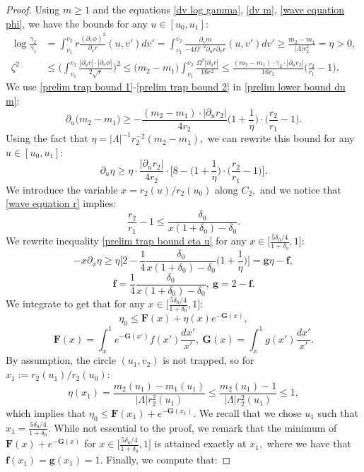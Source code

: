 \documentclass[11pt]{article}
\numberwithin{equation}{section}
\begin{document}
\begin{proof}
    
    Using $m\geq1$ and the equations \eqref{dv log gamma}, \eqref{dv m}, \eqref{wave equation phi}, we have the bounds for any $u\in[u_0,u_1]$:
    \begin{align}
        \log\frac{\gamma_2}{\gamma_1}&=\int_{v_1}^{v_2}r\frac{(\partial_v\phi)^2}{\partial_vr}(u,v')dv'=\int_{v_1}^{v_2}\frac{\partial_vm}{-4\Omega^{-2}\partial_ur\partial_vr}(u,v')dv'\geq\frac{m_2-m_1}{|\Lambda|r_2^2}=\eta>0,\label{prelim trap bound 1}\\
        \zeta^2&\leq\bigg(\int_{v_1}^{v_2}\frac{|\partial_ur|\cdot|\partial_v\phi|}{2\sqrt{r}}\bigg)^2\leq\big(m_2-m_1\big)\int_{v_1}^{v_2}\frac{\Omega^{2}|\partial_ur|}{16r^2}\leq\frac{(m_2-m_1)\cdot \gamma_2\cdot|\partial_ur_2|}{16r_2}\bigg(\frac{r_2}{r_1}-1\bigg).\label{prelim trap bound 2}
    \end{align}
    We use \eqref{prelim trap bound 1}-\eqref{prelim trap bound 2} in \eqref{prelim lower bound du m}:
    \[\partial_u\big(m_2-m_1\big)\geq-\frac{(m_2-m_1)\cdot|\partial_ur_2|}{4r_2}\bigg(1+\frac{1}{\eta}\bigg)\cdot\bigg(\frac{r_2}{r_1}-1\bigg).\]
    Using the fact that $\eta=|\Lambda|^{-1}r_2^{-2}(m_2-m_1),$ we can rewrite this bound for any $u\in[u_0,u_1]$:
    \begin{equation}\label{prelim trap bound eta u}
        \partial_u\eta\geq\eta\cdot\frac{|\partial_ur_2|}{4r_2}\cdot\bigg[8-\bigg(1+\frac{1}{\eta}\bigg)\cdot\bigg(\frac{r_2}{r_1}-1\bigg)\bigg].
    \end{equation}
    We introduce the variable $x=r_2(u)/r_{2}(u_0)$ along $C_2,$ and we notice that \eqref{wave equation r} implies:
    \[\frac{r_2}{r_1}-1\leq\frac{\delta_0}{x(1+\delta_0)-\delta_0}.\]
    We rewrite inequality \eqref{prelim trap bound eta u} for any $x\in\big[\frac{5\delta_0/4}{1+\delta_0},1\big]$:
    \[-x\partial_x\eta\geq\eta\bigg[2-\frac{1}{4}\frac{\delta_0}{x(1+\delta_0)-\delta_0}\bigg(1+\frac{1}{\eta}\bigg)\bigg]=\mathbf{g}\eta-\mathbf{f},\]
    \[\mathbf{f}=\frac{1}{4}\frac{\delta_0}{x(1+\delta_0)-\delta_0},\ \mathbf{g}=2-\mathbf{f}.\]
    We integrate to get that for any $x\in\big[\frac{5\delta_0/4}{1+\delta_0},1\big]$:
    \[\eta_0\leq\mathbf{F}(x)+\eta(x)e^{-\mathbf{G}(x)},\]
    \[\mathbf{F}(x)=\int_x^1e^{-\mathbf{G}(x')}f(x')\frac{dx'}{x'},\ \mathbf{G}(x)=\int_x^1g(x')\frac{dx'}{x'}.\]
    By assumption, the circle $(u_1,v_2)$ is not trapped, so for $x_1:=r_2(u_1)/r_{2}(u_0):$
    \[\eta(x_1)=\frac{m_2(u_1)-m_1(u_1)}{|\Lambda|r_2^2(u_1)}\leq\frac{m_2(u_1)-1}{|\Lambda|r_2^2(u_1)}\leq1,\]
    which implies that $\eta_0\leq\mathbf{F}(x_1)+e^{-\mathbf{G}(x_1)}.$ We recall that we chose $u_1$ such that $x_1=\frac{5\delta_0/4}{1+\delta_0}.$ While not essential to the proof, we remark that the minimum of $\mathbf{F}(x)+e^{-\mathbf{G}(x)}$ for $x\in\big[\frac{5\delta_0/4}{1+\delta_0},1\big]$ is attained exactly at $x_1,$ where we have that $\mathbf{f}(x_1)=\mathbf{g}(x_1)=1.$ Finally, we compute that:

\end{proof}
\end{document}

